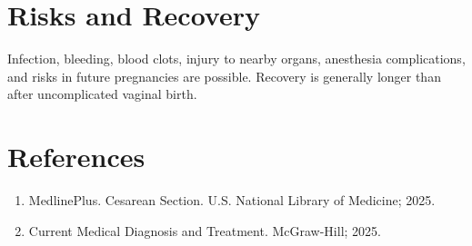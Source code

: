 \section*{Risks and Recovery}
Infection, bleeding, blood clots, injury to nearby organs, anesthesia complications, and risks in future pregnancies are possible. Recovery is generally longer than after uncomplicated vaginal birth.

\section*{References}
\begin{enumerate}
  \item MedlinePlus. Cesarean Section. U.S. National Library of Medicine; 2025.
  \item Current Medical Diagnosis and Treatment. McGraw-Hill; 2025.
\end{enumerate}
\clearpage
